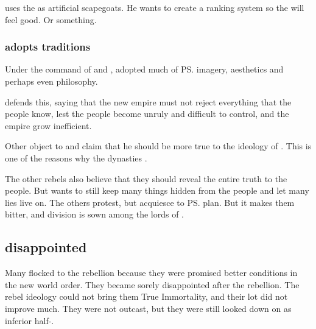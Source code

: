 
\Morcariel{} uses the \ashenblooded{} as artificial scapegoats. 
He wants to create a ranking system so the \resphain{} will feel good. 
Or something. 






\subsubsection{\CiriathSepher adopts \Merkyran traditions}
Under the command of \Morcariel and \Azraid, \CiriathSepher adopted much of \ps{\Merkyrah}{} imagery, aesthetics and perhaps even philosophy. 

\Azraid{} defends this, saying that the new empire must not reject everything that the people know, lest the people become unruly and difficult to control, and the empire grow inefficient.

Other \resphain{} object to  and claim that he should be more true to the ideology of . 
This is one of the reasons why the \resphan dynasties .

The other rebels also believe that they should reveal the entire truth to the people. But \Azraid{} wants to still keep many things hidden from the people and let many lies live on. The others protest, but acquiesce to \ps{\Azraid}{} plan. But it makes them bitter, and division is sown among the lords of \CiriathSepher. 









\subsection{\Bezedeth disappointed}
Many \bezedeth flocked to the rebellion because they were promised better conditions in the new world order. 
They became sorely disappointed after the rebellion. 
The rebel ideology could not bring them True Immortality, and their lot did not improve much.
They were not outcast, but they were still looked down on as inferior half-\resphain.










